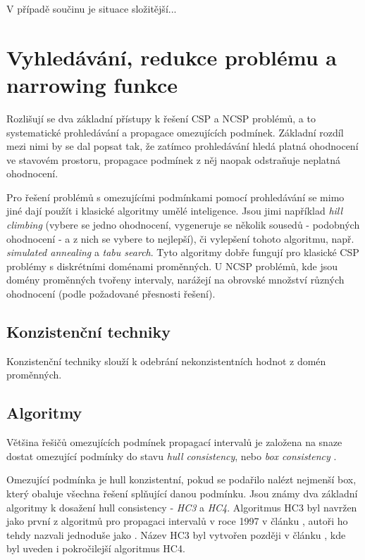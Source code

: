V případě součinu je situace složitější... 









\section{Vyhledávání, redukce problému a narrowing funkce}
\label{ch:searchReduction}
Rozlišují se dva základní přístupy k řešení CSP a NCSP problémů, a to systematické prohledávání a propagace omezujících podmínek. Základní rozdíl mezi nimi by se dal popsat tak, že zatímco prohledávání hledá platná ohodnocení ve stavovém prostoru, propagace podmínek z něj naopak odstraňuje neplatná ohodnocení. \cite{Vu2005}

Pro řešení problémů s omezujícími podmínkami pomocí prohledávání se mimo jiné dají použít i klasické algoritmy umělé inteligence. Jsou jimi například \emph{hill climbing} (vybere se jedno ohodnocení, vygeneruje se několik sousedů - podobných ohodnocení - a z nich se vybere to nejlepší), či vylepšení tohoto algoritmu, např. \emph{simulated annealing} a \emph{tabu search}. Tyto algoritmy dobře fungují pro klasické CSP problémy s diskrétními doménami proměnných. U NCSP problémů, kde jsou domény proměnných tvořeny intervaly, narážejí na obrovské množství různých ohodnocení (podle požadované přesnosti řešení).



\subsection{Konzistenční techniky}
Konzistenční techniky slouží k odebrání nekonzistentních hodnot z domén proměnných.

\subsection{Algoritmy}
Většina řešičů omezujících podmínek propagací intervalů je založena na snaze dostat omezující podmínky do stavu \emph{hull consistency}, nebo \emph{box consistency} \cite{Benhamou99revisinghull}.

Omezující podmínka je hull konzistentní, pokud se podařilo nalézt nejmenší box, který obaluje všechna řešení splňující danou podmínku. Jsou známy dva základní algoritmy k dosažení hull consistency - \emph{HC3} a \emph{HC4}. Algoritmus HC3 byl navržen jako první z algoritmů pro propagaci intervalů v roce 1997 v článku \cite{Benhamou97applyinginterval}, autoři ho tehdy nazvali jednoduše jako . Název HC3 byl vytvořen později v článku \cite{Benhamou99revisinghull}, kde byl uveden i pokročilejší algoritmus HC4.

